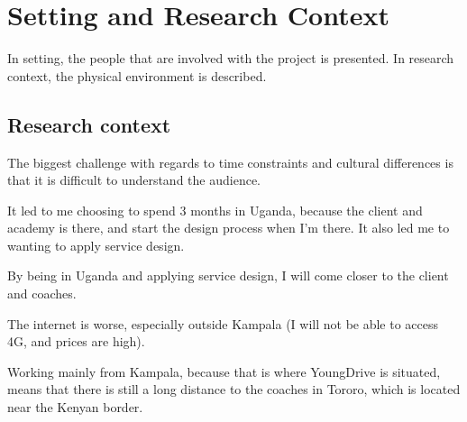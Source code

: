 \section{Setting and Research Context}

In setting, the people that are involved with the project is presented. In research context, the physical environment is described.



\subsection{Research context}

The biggest challenge with regards to time constraints and cultural differences is that it is difficult to understand the audience.

It led to me choosing to spend 3 months in Uganda, because the client and academy is there, and start the design process when I'm there. It also led me to wanting to apply service design.

By being in Uganda and applying service design, I will come closer to the client and coaches.

The internet is worse, especially outside Kampala (I will not be able to access 4G, and prices are high).

Working mainly from Kampala, because that is where YoungDrive is situated, means that there is still a long distance to the coaches in Tororo, which is located near the Kenyan border.
